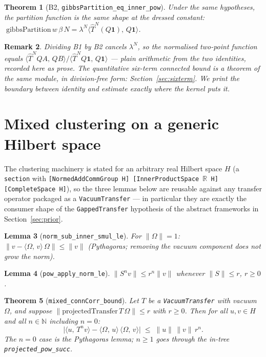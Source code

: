 \documentclass[11pt]{article}
\newtheorem{theorem}{Theorem}[section]
\newtheorem{lemma}[theorem]{Lemma}
\newtheorem{remark}[theorem]{Remark}
\newcommand{\lean}[1]{\texttt{#1}}
\newcommand{\ip}[2]{\langle #1,\,#2\rangle}
\begin{document}
\begin{theorem}[B2, \lean{gibbsPartition\_eq\_inner\_pow}]
Under the same hypotheses, the partition function is the same shape at
the dressed constant:
$\;\mathrm{gibbsPartition}\,w\,\beta\,N = \lambda^N
\ip{\hat T^N (Q\mathbf 1)}{Q\mathbf 1}$.
\end{theorem}

\begin{remark}
Dividing B1 by B2 cancels $\lambda^N$, so the \emph{normalised}
two-point function equals
$\ip{\hat T^N QA}{QB}/\ip{\hat T^N Q\mathbf 1}{Q\mathbf 1}$ --- plain
arithmetic from the two identities, recorded here as prose.  The
quantitative six-term \emph{connected} bound is a theorem of the same
module, in division-free form: Section~\ref{sec:sixterm}.  We print
the boundary between identity and estimate exactly where the kernel
puts it.
\end{remark}

\section{Mixed clustering on a generic Hilbert space}
\label{sec:mixed}
The clustering machinery is stated for an arbitrary real Hilbert
space $H$ (a \lean{section} with
\lean{[NormedAddCommGroup H] [InnerProductSpace \(\mathbb{R}\) H]
[CompleteSpace H]}), so the three lemmas below are reusable against
any transfer operator packaged as a \lean{VacuumTransfer} --- in
particular they are exactly the consumer shape of the
\lean{GappedTransfer} hypothesis of the abstract frameworks in
Section~\ref{sec:prior}.

\begin{lemma}[\lean{norm\_sub\_inner\_smul\_le}]
For $\lVert\Omega\rVert = 1$:
$\lVert v - \ip{\Omega}{v}\,\Omega\rVert \le \lVert v\rVert$
(Pythagoras; removing the vacuum component does not grow the norm).
\end{lemma}

\begin{lemma}[\lean{pow\_apply\_norm\_le}]
$\lVert S^n v\rVert \le r^n \lVert v\rVert$ whenever
$\lVert S\rVert \le r$, $r \ge 0$.
\end{lemma}

\begin{theorem}[\lean{mixed\_connCorr\_bound}]
Let $T$ be a \lean{VacuumTransfer} with vacuum $\Omega$, and suppose
$\lVert \mathrm{projectedTransfer}\,T\,\Omega\rVert \le r$ with
$r \ge 0$.  Then for all $u, v \in H$ and all $n \in \mathbb{N}$
\emph{including $n = 0$}:
\[
\bigl|\ip{u}{T^n v} - \ip{\Omega}{u}\,\ip{\Omega}{v}\bigr|
  \;\le\; \lVert u\rVert\,\lVert v\rVert\, r^n .
\]
The $n = 0$ case is the Pythagoras lemma; $n \ge 1$ goes through the
in-tree \lean{projected\_pow\_succ}.
\end{theorem}
\end{document}
